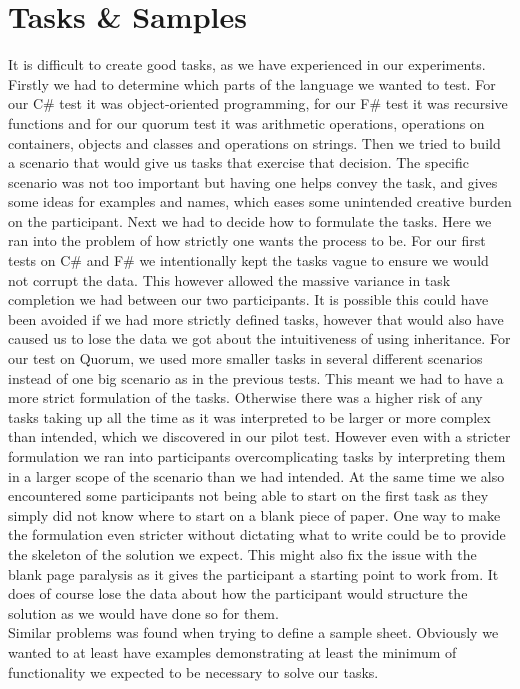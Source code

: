 \section{Tasks \& Samples}
It is difficult to create good tasks, as we have experienced in our experiments.
Firstly we had to determine which parts of the language we wanted to test.
For our C\# test it was object-oriented programming, for our F\# test it was recursive functions and for our quorum test it was arithmetic operations, operations on containers, objects and classes and operations on strings.
Then we tried to build a scenario that would give us tasks that exercise that decision.
The specific scenario was not too important but having one helps convey the task, and gives some ideas for examples and names, which eases some unintended creative burden on the participant.
Next we had to decide how to formulate the tasks.
Here we ran into the problem of how strictly one wants the process to be.
For our first tests on C\# and F\# we intentionally kept the tasks vague to ensure we would not corrupt the data.
This however allowed the massive variance in task completion we had between our two participants.
It is possible this could have been avoided if we had more strictly defined tasks, however that would also have caused us to lose the data we got about the intuitiveness of using inheritance.
For our test on Quorum, we used more smaller tasks in several different scenarios instead of one big scenario as in the previous tests.
This meant we had to have a more strict formulation of the tasks.
Otherwise there was a higher risk of any tasks taking up all the time as it was interpreted to be larger or more complex than intended, which we discovered in our pilot test.
However even with a stricter formulation we ran into participants overcomplicating tasks by interpreting them in a larger scope of the scenario than we had intended.
At the same time we also encountered some participants not being able to start on the first task as they simply did not know where to start on a blank piece of paper.
One way to make the formulation even stricter without dictating what to write could be to provide the skeleton of the solution we expect.
This might also fix the issue with the blank page paralysis as it gives the participant a starting point to work from.
It does of course lose the data about how the participant would structure the solution as we would have done so for them.
\\
Similar problems was found when trying to define a sample sheet.
Obviously we wanted to at least have examples demonstrating at least the minimum of functionality we expected to be necessary to solve our tasks.
